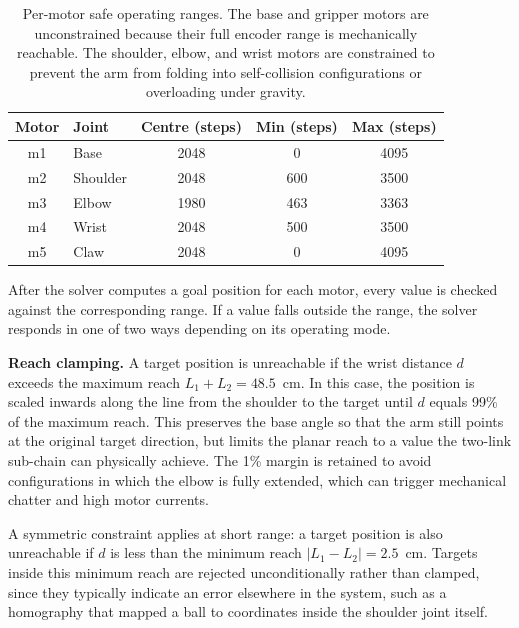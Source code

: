 \begin{table}[H]
    \centering
    \renewcommand{\arraystretch}{1.3}
    \begin{tabular}{|c|l|c|c|c|}
        \hline
        \textbf{Motor} & \textbf{Joint} & 
        \textbf{Centre (steps)} & 
        \textbf{Min (steps)} & \textbf{Max (steps)} \\
        \hline
        m1 & Base    & 2048 & 0    & 4095 \\
        \hline
        m2 & Shoulder & 2048 & 600  & 3500 \\
        \hline
        m3 & Elbow   & 1980 & 463  & 3363 \\
        \hline
        m4 & Wrist   & 2048 & 500  & 3500 \\
        \hline
        m5 & Claw    & 2048 & 0    & 4095 \\
        \hline
    \end{tabular}
    \caption{Per-motor safe operating ranges. The base and gripper 
    motors are unconstrained because their full encoder range is 
    mechanically reachable. The shoulder, elbow, and wrist motors 
    are constrained to prevent the arm from folding into 
    self-collision configurations or overloading under gravity.}
\end{table}

After the solver computes a goal position for each motor, every 
value is checked against the corresponding range. If a value 
falls outside the range, the solver responds in one of two ways 
depending on its operating mode.

\textbf{Reach clamping.} A target position is unreachable if 
the wrist distance $d$ exceeds the maximum reach 
$L_1 + L_2 = 48.5$~cm. In this case, the position is scaled 
inwards along the line from the shoulder to the target until $d$ 
equals 99\% of the maximum reach. This preserves the base angle 
so that the arm still points at the original target direction, 
but limits the planar reach to a value the two-link sub-chain 
can physically achieve. The 1\% margin is retained to avoid 
configurations in which the elbow is fully extended, which can 
trigger mechanical chatter and high motor currents.

A symmetric constraint applies at short range: a target 
position is also unreachable if $d$ is less than the minimum 
reach $|L_1 - L_2| = 2.5$~cm. Targets inside this minimum reach 
are rejected unconditionally rather than clamped, since they 
typically indicate an error elsewhere in the system, such as a 
homography that mapped a ball to coordinates inside the 
shoulder joint itself.

